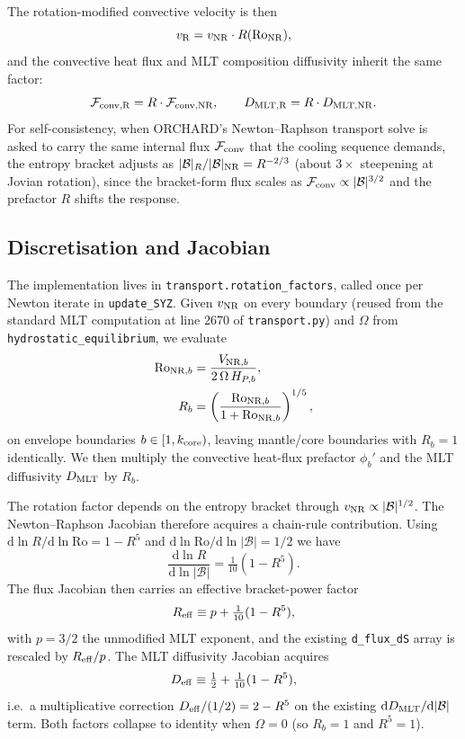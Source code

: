 \documentclass{aastex631}
\newcommand{\dd}{\mathrm{d}}
\newcommand{\VNR}{v_{\rm NR}}
\newcommand{\VR}{v_{\rm R}}
\newcommand{\Roo}{\mathrm{Ro}}
\newcommand{\Rofunc}{R(\Roo_{\rm NR})}
\newcommand{\Dmlt}{D_{\rm MLT}}
\newcommand{\bracketb}{\mathcal{B}}
\begin{document}
The rotation-modified convective velocity is then
\begin{equation}
\VR = \VNR \cdot \Rofunc,
\label{eq:VR}
\end{equation}
and the convective heat flux and MLT composition diffusivity inherit
the same factor:
\begin{equation}
\mathcal{F}_{\rm conv,R} = R \cdot \mathcal{F}_{\rm conv,NR},
\quad\quad
D_{\rm MLT,R} = R \cdot D_{\rm MLT,NR}.
\end{equation}
For self-consistency, when ORCHARD's Newton--Raphson transport solve
is asked to carry the same internal flux $\mathcal{F}_{\rm conv}$
that the cooling sequence demands, the entropy bracket adjusts as
$|\bracketb|_R / |\bracketb|_{\rm NR} = R^{-2/3}$ (about $3\times$
steepening at Jovian rotation), since the bracket-form flux scales as
$\mathcal{F}_{\rm conv} \propto |\bracketb|^{3/2}$ and the prefactor
$R$ shifts the response.

\subsection{Discretisation and Jacobian}

The implementation lives in
\texttt{transport.rotation\_factors}, called once per Newton iterate
in \texttt{update\_SYZ}.  Given $\VNR$ on every boundary
(reused from the standard MLT computation at line 2670 of
\texttt{transport.py}) and $\Omega$ from
\texttt{hydrostatic\_equilibrium}, we evaluate
\begin{align}
\Roo_{{\rm NR},b} &= \frac{V_{{\rm NR},b}}{2\,\Omega\,H_{P,b}}, \\
R_b   &= \left(\frac{\Roo_{{\rm NR},b}}{1+\Roo_{{\rm NR},b}}\right)^{1/5},
\end{align}
on envelope boundaries $b \in [1, k_{\rm core})$, leaving
mantle/core boundaries with $R_b = 1$ identically.  We then multiply
the convective heat-flux prefactor $\phi_b'$ and the MLT diffusivity
$\Dmlt$ by $R_b$.

The rotation factor depends on the entropy bracket through
$\VNR \propto |\bracketb|^{1/2}$.  The Newton--Raphson Jacobian
therefore acquires a chain-rule contribution.  Using
$\dd\ln R / \dd \ln \Roo = 1 - R^5$ and
$\dd\ln \Roo / \dd \ln |\bracketb| = 1/2$ we have
\begin{equation}
\frac{\dd\ln R}{\dd \ln |\bracketb|} = \tfrac{1}{10}(1 - R^5).
\end{equation}
The flux Jacobian then carries an effective bracket-power factor
\begin{equation}
R_{\rm eff} \equiv p + \tfrac{1}{10}(1 - R^5),
\label{eq:Reff}
\end{equation}
with $p = 3/2$ the unmodified MLT exponent, and the existing
\texttt{d\_flux\_dS} array is rescaled by $R_{\rm eff}/p$.  The MLT
diffusivity Jacobian acquires
\begin{equation}
D_{\rm eff} \equiv \tfrac{1}{2} + \tfrac{1}{10}(1 - R^5),
\label{eq:Deff}
\end{equation}
i.e.\ a multiplicative correction $D_{\rm eff}/(1/2) = 2 - R^5$ on
the existing $\dd \Dmlt/\dd|\bracketb|$ term.  Both factors collapse
to identity when $\Omega = 0$ (so $R_b = 1$ and $R^5 = 1$).
\end{document}
